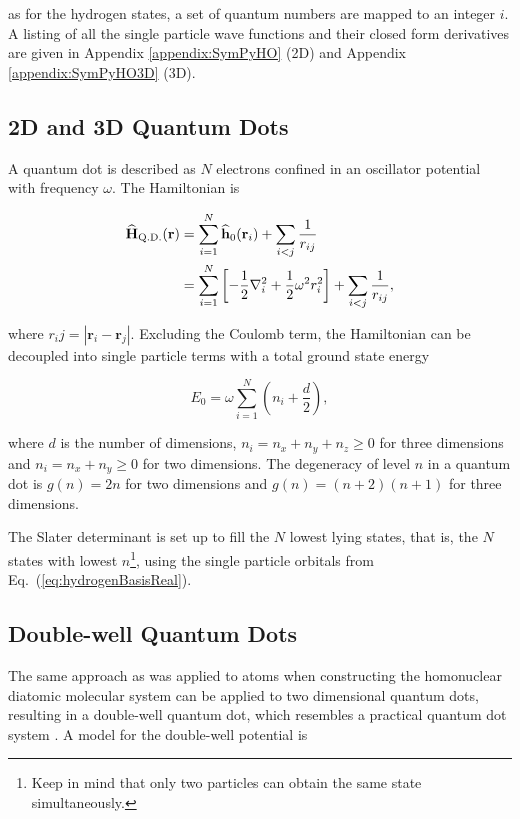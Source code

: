 as for the hydrogen states, a set of quantum numbers are mapped to an integer $i$.  A listing of all the single particle wave functions and their closed form derivatives are given in Appendix \ref{appendix:SymPyHO} (2D) and Appendix \ref{appendix:SymPyHO3D} (3D). 


\subsection{2D and 3D Quantum Dots}

A quantum dot is described as $N$ electrons confined in an oscillator potential with frequency $\omega$. The Hamiltonian is

\begin{align}
 {\bf\widehat{H}}_{\mathrm{Q.D.}}(\mathbf{r}) &= \sum_{i=1}^N {\bf\widehat{h}}_0(\mathbf{r}_i) + \sum_{i<j} \frac{1}{r_{ij}} \\
                         &= \sum_{i=1}^N \left[-\frac{1}{2}\nabla_i^2 + \frac{1}{2}\omega^2r_i^2 \right] + \sum_{i<j} \frac{1}{r_{ij}},
\end{align}

where $r_ij = |\mathbf{r}_i -\mathbf{r}_j|$. Excluding the Coulomb term, the Hamiltonian can be decoupled into single particle terms with a total ground state energy

\begin{equation}
 E_0 = \omega\sum_{i=1}^N \left(n_i + \frac{d}{2}\right),
\end{equation}

where $d$ is the number of dimensions, $n_i = n_x + n_y + n_z \ge 0$ for three dimensions and $n_i = n_x + n_y \ge 0$ for two dimensions. The degeneracy of level $n$ in a quantum dot is $g(n) = 2n$ for two dimensions and $g(n) = (n+2)(n+1)$ for three dimensions.

The Slater determinant is set up to fill the $N$ lowest lying states, that is, the $N$ states with lowest $n$\footnote{Keep in mind that only two particles can obtain the same state simultaneously.}, using the single particle orbitals from Eq.~(\ref{eq:hydrogenBasisReal}).


\subsection{Double-well Quantum Dots}

The same approach as was applied to atoms when constructing the homonuclear diatomic molecular system can be applied to two dimensional quantum dots, resulting in a double-well quantum dot, which resembles a practical quantum dot system \cite{doubleWellExpt}. A model for the double-well potential is \cite{ymwang}

